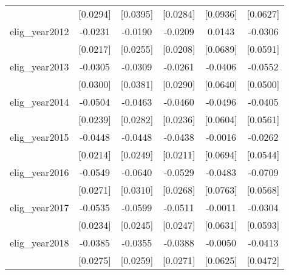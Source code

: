 \begin{table}[htbp]
\begin{tabular}{l*{5}{c}}
                    &    [0.0294]         &    [0.0395]         &    [0.0284]         &    [0.0936]         &    [0.0627]         \\
\addlinespace
elig\_year2012       &     -0.0231         &     -0.0190         &     -0.0209         &      0.0143         &     -0.0306         \\
                    &    [0.0217]         &    [0.0255]         &    [0.0208]         &    [0.0689]         &    [0.0591]         \\
\addlinespace
elig\_year2013       &     -0.0305         &     -0.0309         &     -0.0261         &     -0.0406         &     -0.0552         \\
                    &    [0.0300]         &    [0.0381]         &    [0.0290]         &    [0.0640]         &    [0.0500]         \\
\addlinespace
elig\_year2014       &     -0.0504\sym{**} &     -0.0463         &     -0.0460\sym{*}  &     -0.0496         &     -0.0405         \\
                    &    [0.0239]         &    [0.0282]         &    [0.0236]         &    [0.0604]         &    [0.0561]         \\
\addlinespace
elig\_year2015       &     -0.0448\sym{**} &     -0.0448         &     -0.0438\sym{**} &     -0.0016         &     -0.0262         \\
                    &    [0.0214]         &    [0.0249]         &    [0.0211]         &    [0.0694]         &    [0.0544]         \\
\addlinespace
elig\_year2016       &     -0.0549\sym{**} &     -0.0640\sym{*}  &     -0.0529\sym{*}  &     -0.0483         &     -0.0709         \\
                    &    [0.0271]         &    [0.0310]         &    [0.0268]         &    [0.0763]         &    [0.0568]         \\
\addlinespace
elig\_year2017       &     -0.0535\sym{**} &     -0.0599\sym{**} &     -0.0511\sym{**} &     -0.0011         &     -0.0304         \\
                    &    [0.0234]         &    [0.0245]         &    [0.0247]         &    [0.0631]         &    [0.0593]         \\
\addlinespace
elig\_year2018       &     -0.0385         &     -0.0355         &     -0.0388         &     -0.0050         &     -0.0413         \\
                    &    [0.0275]         &    [0.0259]         &    [0.0271]         &    [0.0625]         &    [0.0472]         \\

\end{tabular}
\end{table}
